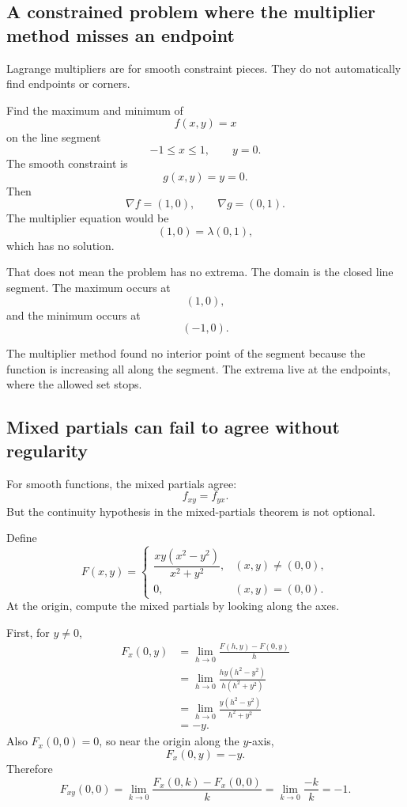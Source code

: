 \subsection{A constrained problem where the multiplier method misses an endpoint}

Lagrange multipliers are for smooth constraint pieces.  They do not automatically find
endpoints or corners.

Find the maximum and minimum of
\[
    f(x,y)=x
\]
on the line segment
\[
    -1\le x\le1,
    \qquad
    y=0.
\]
The smooth constraint is
\[
    g(x,y)=y=0.
\]
Then
\[
    \nabla f=(1,0),
    \qquad
    \nabla g=(0,1).
\]
The multiplier equation would be
\[
    (1,0)=\lambda(0,1),
\]
which has no solution.

That does not mean the problem has no extrema.  The domain is the closed line segment.
The maximum occurs at
\[
    (1,0),
\]
and the minimum occurs at
\[
    (-1,0).
\]

The multiplier method found no interior point of the segment because the function is
increasing all along the segment.  The extrema live at the endpoints, where the allowed
set stops.

\subsection{Mixed partials can fail to agree without regularity}

For smooth functions, the mixed partials agree:
\[
    f_{xy}=f_{yx}.
\]
But the continuity hypothesis in the mixed-partials theorem is not optional.

Define
\[
    F(x,y)=
    \begin{cases}
    \dfrac{xy(x^2-y^2)}{x^2+y^2}, & (x,y)\ne(0,0),\\[3mm]
    0, & (x,y)=(0,0).
    \end{cases}
\]
At the origin, compute the mixed partials by looking along the axes.

First, for \(y\ne0\),
\[
\begin{aligned}
F_x(0,y)
&=
\lim_{h\to0}
\frac{F(h,y)-F(0,y)}{h}\\
&=
\lim_{h\to0}
\frac{hy(h^2-y^2)}{h(h^2+y^2)}\\
&=
\lim_{h\to0}
\frac{y(h^2-y^2)}{h^2+y^2}\\
&=
-y.
\end{aligned}
\]
Also \(F_x(0,0)=0\), so near the origin along the \(y\)-axis,
\[
    F_x(0,y)=-y.
\]
Therefore
\[
    F_{xy}(0,0)
    =
    \lim_{k\to0}
    \frac{F_x(0,k)-F_x(0,0)}{k}
    =
    \lim_{k\to0}
    \frac{-k}{k}
    =
    -1.
\]

